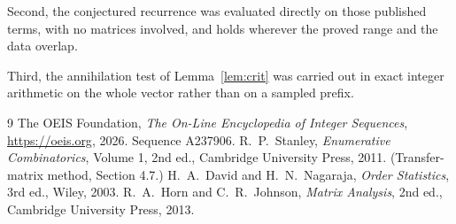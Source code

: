 \documentclass[11pt,a4paper]{article}
\theoremstyle{plain}
\theoremstyle{definition}
\begin{document}
Second, the conjectured recurrence was evaluated directly on those published terms, with no
matrices involved, and holds wherever the proved range and the data overlap.

Third, the annihilation test of Lemma~\ref{lem:crit} was carried out in exact integer
arithmetic on the whole vector rather than on a sampled prefix.

\begin{thebibliography}{9}
 The OEIS Foundation, \emph{The On-Line Encyclopedia of Integer
Sequences}, \url{https://oeis.org}, 2026. Sequence A237906.
 R.~P.~Stanley, \emph{Enumerative Combinatorics}, Volume 1, 2nd ed.,
Cambridge University Press, 2011. (Transfer-matrix method, Section 4.7.)
 H.~A.~David and H.~N.~Nagaraja, \emph{Order Statistics}, 3rd ed., Wiley,
2003.
 R.~A.~Horn and C.~R.~Johnson, \emph{Matrix Analysis}, 2nd ed., Cambridge
University Press, 2013.
\end{thebibliography}
\end{document}
